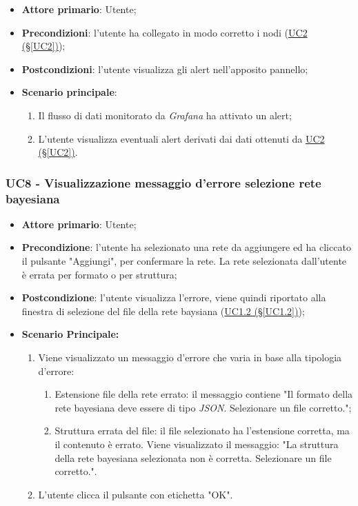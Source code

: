 \begin{itemize}
	\item \textbf{Attore primario}: Utente;
	\item \textbf{Precondizioni}: l'utente ha collegato in modo corretto i nodi 
	(\hyperref[UC2]{UC2 (§\ref*{UC2})});
	\item \textbf{Postcondizioni}: l'utente visualizza gli alert nell'apposito pannello;
	\item \textbf{Scenario principale}:
	\begin{enumerate}
		\item Il flusso di dati monitorato da \textit{Grafana} ha attivato un alert;
		\item L'utente visualizza eventuali alert derivati dai dati ottenuti da  \hyperref[UC2]{UC2 (§\ref*{UC2})}.
	\end{enumerate}
\end{itemize}

\pagebreak

\subsubsection{UC8 - Visualizzazione messaggio d'errore selezione  rete bayesiana}\label{UC8}
\begin{itemize}
\item \textbf{Attore primario}: Utente;
\item \textbf{Precondizione}: l'utente ha selezionato una rete da aggiungere ed ha cliccato il pulsante "Aggiungi", per confermare la rete. La rete selezionata dall'utente è errata per formato o per struttura;
\item \textbf{Postcondizione}: l'utente visualizza l'errore, viene quindi riportato alla finestra di selezione del file della rete baysiana (\hyperref[UC1.2]{UC1.2 (§\ref*{UC1.2})});
\item \textbf{Scenario Principale:} 
	\begin{enumerate}
		\item Viene visualizzato un messaggio d'errore che varia in base alla tipologia d'errore:
			\begin{enumerate}
				\item Estensione file della rete errato: il messaggio contiene "Il formato della rete bayesiana deve essere di tipo \textit{JSON}. Selezionare un file corretto.";
				\item Struttura errata del file: il file selezionato ha l'estensione corretta, ma il contenuto è errato. Viene visualizzato il messaggio: "La struttura della rete bayesiana selezionata non è corretta. Selezionare un file corretto.".
			\end{enumerate}
		\item L'utente clicca il pulsante con etichetta "OK".
	\end{enumerate}
\end{itemize}

